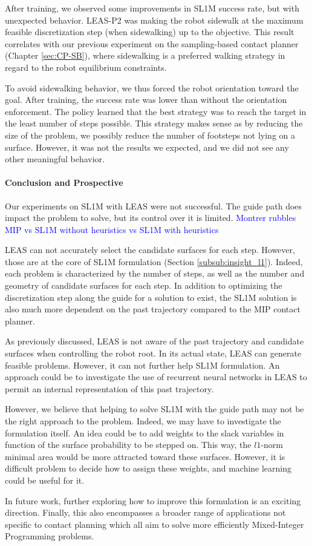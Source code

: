 After training, we observed some improvements in SL1M success rate, but with unexpected behavior.
LEAS-P2 was making the robot sidewalk at the maximum feasible discretization step (when sidewalking) up to the objective.
This result correlates with our previous experiment on the sampling-based contact planner (Chapter \ref{sec:CP-SB}), where sidewalking is a preferred walking strategy in regard to the robot equilibrium constraints.

To avoid sidewalking behavior, we thus forced the robot orientation toward the goal.
After training, the success rate was lower than without the orientation enforcement.
The policy learned that the best strategy was to reach the target in the least number of steps possible.
This strategy makes sense as by reducing the size of the problem, we possibly reduce the number of footsteps not lying on a surface.
However, it was not the results we expected, and we did not see any other meaningful behavior.

\paragraph{Conclusion and Prospective}

Our experiments on SL1M with LEAS were not successful.
The guide path does impact the problem to solve, but its control over it is limited.
\textcolor{blue}{Montrer rubbles MIP vs SL1M without heuristics vs SL1M with heuristics}

LEAS can not accurately select the candidate surfaces for each step. However, those are at the core of SL1M formulation (Section \ref{subsub:insight_l1}). 
Indeed, each problem is characterized by the number of steps, as well as the number and geometry of candidate surfaces for each step.
In addition to optimizing the discretization step along the guide for a solution to exist, the SL1M solution is also much more dependent on the past trajectory compared to the MIP contact planner.

As previously discussed, LEAS is not aware of the past trajectory and candidate surfaces when controlling the robot root. 
In its actual state, LEAS can generate feasible problems. However, it can not further help SL1M formulation.
An approach could be to investigate the use of recurrent neural networks in LEAS to permit an internal representation of this past trajectory.

However, we believe that helping to solve SL1M with the guide path may not be the right approach to the problem.
Indeed, we may have to investigate the formulation itself.
An idea could be to add weights to the slack variables in function of the surface probability to be stepped on.
This way, the $l1$-norm minimal area would be more attracted toward these surfaces. 
However, it is difficult problem to decide how to assign these weights, and machine learning could be useful for it.

In future work, further exploring how to improve this formulation is an exciting direction. 
Finally, this also encompasses a broader range of applications not specific to contact planning which all aim to solve more efficiently Mixed-Integer Programming problems.